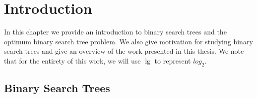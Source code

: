 \documentclass[letterpaper,12pt,titlepage,oneside,final]{book}
\theoremstyle{plain}
\newcommand\blankpage{%
    \null
    \thispagestyle{empty}%
    \addtocounter{page}{-1}%
    \newpage}
\begin{document}
 


\afterpage{\blankpage}

\chapter{Introduction}

In this chapter we provide an introduction to binary search trees and the optimum binary search tree problem. We also give motivation for studying binary search trees and give an overview of the work presented in this thesis. We note that for the entirety of this work, we will use $\lg$ to represent $log_2$.

\section{Binary Search Trees}
\end{document}
